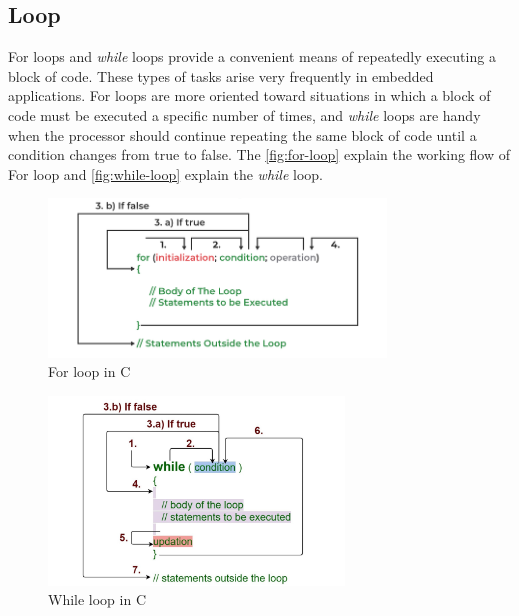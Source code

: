             \vspace{2cm}
            
        \subsection{Loop}
            For loops and \textit{while} loops provide a convenient means of repeatedly executing a block of code. These types of tasks arise very frequently in embedded applications. For loops are more oriented toward situations in which a block of code must be executed a specific number of times, and \textit{while} loops are handy when the processor should continue repeating the same block of code until a condition changes from true to false. The \autoref{fig:for-loop} explain the working flow of For loop and \autoref{fig:while-loop} explain the \textit{while} loop.
            
                \begin{figure}[!ht]
                    \centering
                    \captionsetup{justification=centering,margin=0.05cm}
                    \includegraphics[width=0.8\textwidth]{figures/for-loop.png}
                    \caption{\label{fig:for-loop}For loop in C}
                \end{figure}
    
                \begin{figure}[!ht]
                    \centering
                    \captionsetup{justification=centering,margin=0.05cm}
                    \includegraphics[width=0.7\textwidth]{figures/while-loop.jpg}
                    \caption{\label{fig:while-loop}While loop in C}
                \end{figure}
            \vspace{3cm}
                
